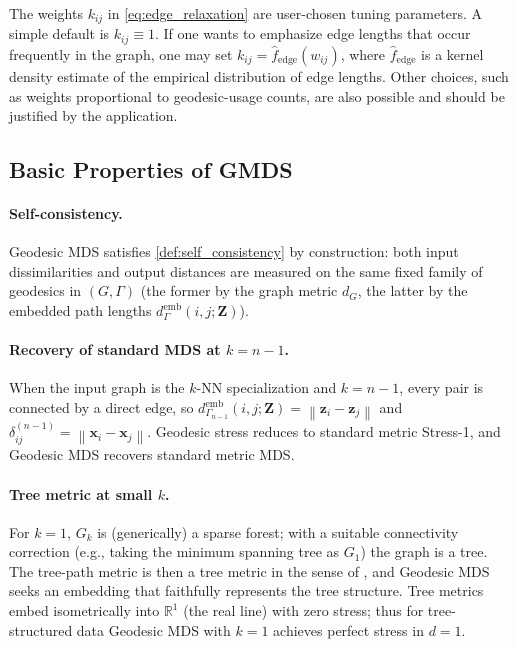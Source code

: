\documentclass[11pt]{article}
\newcommand{\R}{\mathbb{R}}
\newcommand{\bx}{\mathbf{x}}
\newcommand{\bz}{\mathbf{z}}
\newcommand{\bZ}{\mathbf{Z}}
\newcommand{\norm}[1]{\left\|#1\right\|}
\newcommand{\demb}{d^{\mathrm{emb}}}
\newcommand{\Gk}{G_k}
\theoremstyle{definition}
\theoremstyle{plain}
\theoremstyle{remark}
\begin{document}
The weights $k_{ij}$ in \cref{eq:edge_relaxation} are user-chosen tuning
parameters.  A simple default is $k_{ij} \equiv 1$.  If one wants to emphasize
edge lengths that occur frequently in the graph, one may set
$k_{ij} = \hat f_{\mathrm{edge}}(w_{ij})$, where
$\hat f_{\mathrm{edge}}$ is a kernel density estimate of the empirical
distribution of edge lengths.  Other choices, such as weights proportional to
geodesic-usage counts, are also possible and should be justified by the
application.

\subsection{Basic Properties of GMDS}
\label{sec:properties}

\paragraph{Self-consistency.}
Geodesic MDS satisfies \cref{def:self_consistency} by construction:
both input dissimilarities and output distances are measured on the same
fixed family of geodesics in $(G,\Gamma)$ (the former by the graph
metric $d_G$, the latter by the embedded path lengths
$\demb_{\Gamma}(i,j;\bZ)$).

\paragraph{Recovery of standard MDS at $k = n-1$.}
When the input graph is the $k$-NN specialization and $k = n-1$, every
pair is connected by a direct edge, so
$\demb_{\Gamma_{n-1}}(i,j;\bZ) = \norm{\bz_i - \bz_j}$ and
$\delta^{(n-1)}_{ij} = \norm{\bx_i - \bx_j}$.  Geodesic stress reduces to
standard metric Stress-1, and Geodesic MDS recovers standard metric MDS.

\paragraph{Tree metric at small $k$.}
For $k = 1$, $\Gk$ is (generically) a sparse forest; with a suitable
connectivity correction (e.g., taking the minimum spanning tree as
$G_1$) the graph is a tree.  The tree-path metric is then a tree metric in
the sense of \citet{dress1984trees}, and Geodesic MDS seeks an
embedding that faithfully represents the tree structure.  Tree metrics
embed isometrically into $\R^1$ (the real line) with zero stress;
thus for tree-structured data Geodesic MDS with $k=1$ achieves
perfect stress in $d=1$.
\end{document}
